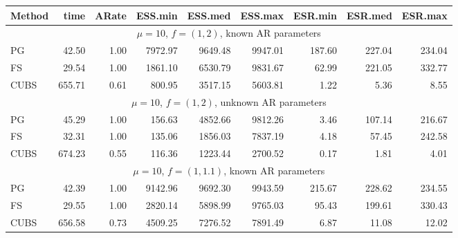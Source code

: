 \documentclass[12pt]{article}
\begin{document}
\begin{table}
\small
\centering
\begin{tabular}{l r r r r r r r r } 
Method  &    time  &   ARate  &  ESS.min  &  ESS.med  &  ESS.max  &  ESR.min  & ESR.med  &  ESR.max \\
\hline
\hline
 \multicolumn{9}{c}{$\mu=10$, $f = (1,2)$, known AR parameters} \\
\hline
             PG   &    42.50 &     1.00 &   7972.97 &   9649.48 &   9947.01 &    187.60 &    227.04 &    234.04 \\ 
             FS   &    29.54 &     1.00 &   1861.10 &   6530.79 &   9831.67 &     62.99 &    221.05 &    332.77 \\ 
           CUBS   &   655.71 &     0.61 &    800.95 &   3517.15 &   5603.81 &      1.22 &      5.36 &      8.55
 \\ %

\hline
 \multicolumn{9}{c}{$\mu=10$, $f = (1,2)$, unknown AR parameters} \\
\hline
             PG   &    45.29 &     1.00 &    156.63 &   4852.66 &   9812.26 &      3.46 &    107.14 &    216.67 \\ 
             FS   &    32.31 &     1.00 &    135.06 &   1856.03 &   7837.19 &      4.18 &     57.45 &    242.58 \\ 
           CUBS   &   674.23 &     0.55 &    116.36 &   1223.44 &   2700.52 &      0.17 &      1.81 &      4.01
 \\ %

\hline
 \multicolumn{9}{c}{$\mu=10$, $f = (1,1.1)$, known AR parameters} \\
\hline
            PG  &    42.39 &     1.00 &   9142.96 &   9692.30 &   9943.59 &    215.67 &    228.62 &    234.55 \\ 
            FS  &    29.55 &     1.00 &   2820.14 &   5898.99 &   9765.03 &     95.43 &    199.61 &    330.43 \\ 
          CUBS  &   656.58 &     0.73 &   4509.25 &   7276.52 &   7891.49 &      6.87 &     11.08 &     12.02


\end{tabular}
\end{table}
\end{document}
